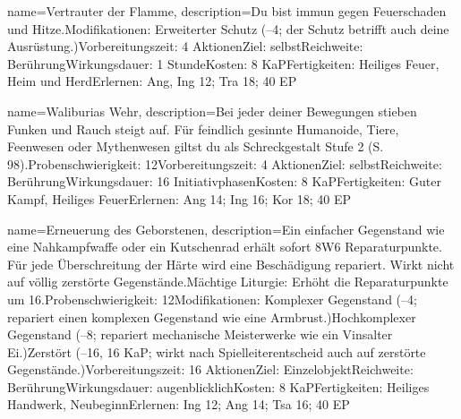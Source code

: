 {
    name={Vertrauter der Flamme},
    description={Du bist immun gegen Feuerschaden und Hitze.\newline Modifikationen: Erweiterter Schutz (–4; der Schutz betrifft auch deine Ausrüstung.)\newline Vorbereitungszeit: 4 Aktionen\newline Ziel: selbst\newline Reichweite: Berührung\newline Wirkungsdauer: 1 Stunde\newline Kosten: 8 KaP\newline Fertigkeiten: Heiliges Feuer, Heim und Herd\newline Erlernen: Ang, Ing 12; Tra 18; 40 EP}
}


{
    name={Waliburias Wehr},
    description={Bei jeder deiner Bewegungen stieben Funken und Rauch steigt auf. Für feindlich gesinnte Humanoide, Tiere, Feenwesen oder Mythenwesen giltst du als Schreckgestalt Stufe 2 (S. 98).\newline Probenschwierigkeit: 12\newline Vorbereitungszeit: 4 Aktionen\newline Ziel: selbst\newline Reichweite: Berührung\newline Wirkungsdauer: 16 Initiativphasen\newline Kosten: 8 KaP\newline Fertigkeiten: Guter Kampf, Heiliges Feuer\newline Erlernen: Ang 14; Ing 16; Kor 18; 40 EP}
}


{
    name={Erneuerung des Geborstenen},
    description={Ein einfacher Gegenstand wie eine Nahkampfwaffe oder ein Kutschenrad erhält sofort 8W6 Reparaturpunkte. Für jede Überschreitung der Härte wird eine Beschädigung repariert. Wirkt nicht auf völlig zerstörte Gegenstände.\newline Mächtige Liturgie: Erhöht die Reparaturpunkte um 16.\newline Probenschwierigkeit: 12\newline Modifikationen: Komplexer Gegenstand (–4; repariert einen komplexen Gegenstand wie eine Armbrust.)\newline Hochkomplexer Gegenstand (–8; repariert mechanische Meisterwerke wie ein Vinsalter Ei.)\newline Zerstört (–16, 16 KaP; wirkt nach Spielleiterentscheid auch auf zerstörte Gegenstände.)\newline Vorbereitungszeit: 16 Aktionen\newline Ziel: Einzelobjekt\newline Reichweite: Berührung\newline Wirkungsdauer: augenblicklich\newline Kosten: 8 KaP\newline Fertigkeiten: Heiliges Handwerk, Neubeginn\newline Erlernen: Ing 12; Ang 14; Tsa 16; 40 EP}
}


